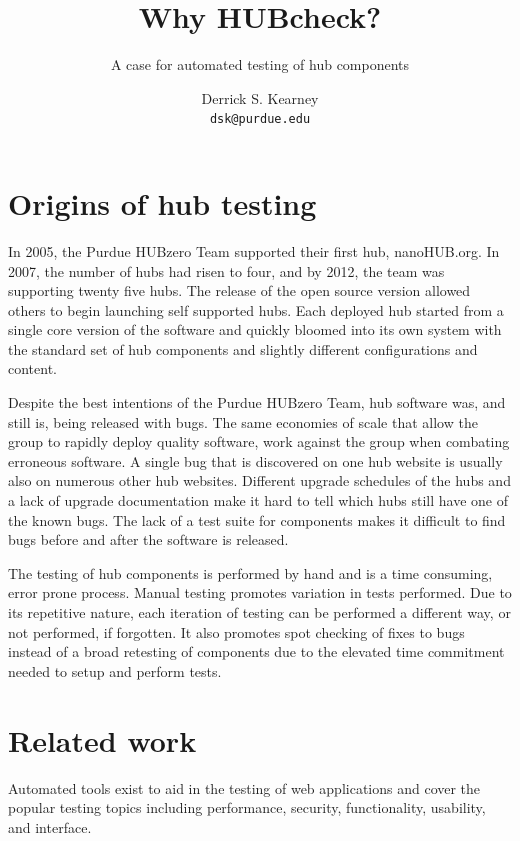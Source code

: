 \documentclass[letterpaper]{scrartcl}
\title{Why HUBcheck?}
\subtitle{A case for automated testing of hub components}
\author{
  Derrick S. Kearney \\
  \texttt{dsk@purdue.edu}
}
\date{}
\begin{document}
\maketitle

\begin{abstract}
\end{abstract}

\section{Origins of hub testing}

In 2005, the Purdue HUBzero Team supported their first hub,
nanoHUB.org. In 2007, the number of hubs had risen to four, and by 2012, the
team was supporting twenty five hubs. The release of the open source version
allowed others to begin launching self supported hubs.  Each deployed hub
started from a single core version of the software and quickly bloomed into its
own system with the standard set of hub components and slightly different
configurations and content.

Despite the best intentions of the Purdue HUBzero Team, hub software
was, and still is, being released with bugs. The same economies of scale that
allow the group to rapidly deploy quality software, work against the group when
combating erroneous software. A single bug that is discovered on one hub
website is usually also on numerous other hub websites. Different upgrade
schedules of the hubs and a lack of upgrade documentation make it hard to tell
which hubs still have one of the known bugs. The lack of a test suite for
components makes it difficult to find bugs before and after the software is
released.

The testing of hub components is performed by hand and is a time consuming,
error prone process.  Manual testing promotes variation in tests performed. Due
to its repetitive nature, each iteration of testing can be performed a
different way, or not performed, if forgotten. It also promotes spot checking
of fixes to bugs instead of a broad retesting of components due to the elevated
time commitment needed to setup and perform tests.

\section{Related work}
\label{sec:related_work}

Automated tools exist to aid in the testing of web applications and cover the
popular testing topics including performance, security, functionality,
usability, and interface.
\end{document}
